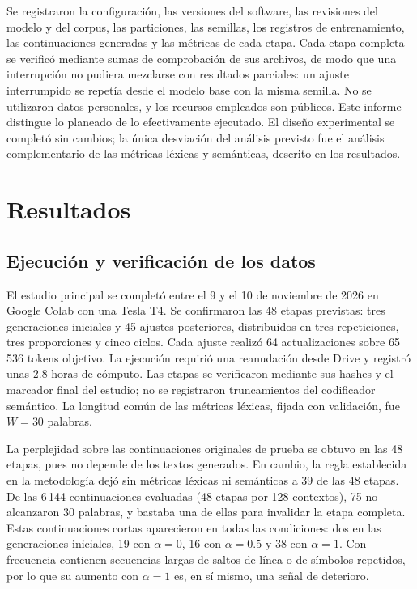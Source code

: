 \documentclass[12pt,letterpaper]{article}
\begin{document}
Se registraron la configuración, las versiones del software, las
revisiones del modelo y del corpus, las particiones, las semillas, los
registros de entrenamiento, las continuaciones generadas y las métricas
de cada etapa. Cada etapa completa se verificó mediante sumas de
comprobación de sus archivos, de modo que una interrupción no pudiera
mezclarse con resultados parciales: un ajuste interrumpido se repetía
desde el modelo base con la misma semilla. No se utilizaron datos
personales, y los recursos empleados son públicos. Este informe distingue
lo planeado de lo efectivamente ejecutado. El diseño experimental se completó sin cambios;
la única desviación del análisis previsto fue el análisis complementario
de las métricas léxicas y semánticas, descrito en los resultados.

\section{Resultados}

\subsection{Ejecución y verificación de los datos}

El estudio principal se completó entre el 9 y el 10 de noviembre de 2026
en Google Colab con una Tesla T4. Se confirmaron las 48 etapas previstas:
tres generaciones iniciales y 45 ajustes posteriores, distribuidos en tres
repeticiones, tres proporciones y cinco ciclos. Cada ajuste realizó 64
actualizaciones sobre 65\,536 tokens objetivo. La ejecución requirió una
reanudación desde Drive y registró unas 2.8 horas de cómputo. Las etapas
se verificaron mediante sus hashes y el marcador final del estudio; no
se registraron truncamientos del codificador semántico. La longitud común
de las métricas léxicas, fijada con validación, fue \(W=30\) palabras.

La perplejidad sobre las continuaciones originales de prueba se obtuvo en
las 48 etapas, pues no depende de los textos generados. En cambio, la regla
establecida en la metodología dejó sin métricas léxicas ni semánticas a 39
de las 48 etapas. De las 6\,144 continuaciones evaluadas (48 etapas por 128
contextos), 75 no alcanzaron 30 palabras, y bastaba una de ellas para
invalidar la etapa completa. Estas continuaciones cortas aparecieron en
todas las condiciones: dos en las generaciones iniciales, 19 con
\(\alpha=0\), 16 con \(\alpha=0.5\) y 38 con \(\alpha=1\). Con frecuencia
contienen secuencias largas de saltos de línea o de símbolos repetidos, por
lo que su aumento con \(\alpha=1\) es, en sí mismo, una señal de deterioro.
\end{document}
